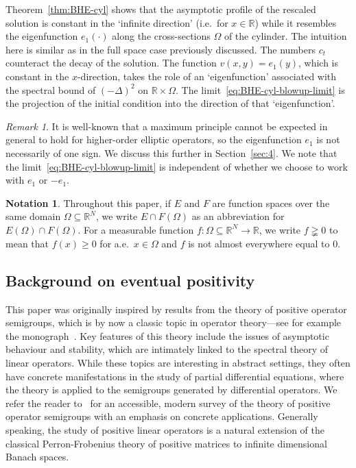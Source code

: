 \documentclass[a4paper, reqno,titlepage]{amsart}
\numberwithin{equation}{section}
\theoremstyle{plain}
\theoremstyle{definition}
\newtheorem*{notation}{Notation}
\theoremstyle{remark}
\newtheorem{remark}[theorem]{Remark}
\newcommand{\RR}{\mathbb{R}}
\begin{document}
Theorem~\ref{thm:BHE-cyl} shows that the asymptotic profile of the rescaled solution is constant in the `infinite direction' (i.e.\ for $x \in \RR$) while it resembles the eigenfunction $e_1(\cdot)$ along the cross-sections $\Omega$ of the cylinder. The intuition here is similar as in the full space case previously discussed. The numbers $c_t$ counteract the decay of the solution. The function $v(x,y)=e_1(y)$, which is constant in the $x$-direction, takes the role of an `eigenfunction' associated with the spectral bound of $(-\Delta)^2$ on $\RR\times\Omega$. The limit~\eqref{eq:BHE-cyl-blowup-limit} is the projection of the initial condition into the direction of that `eigenfunction'.

\begin{remark}
  It is well-known that a maximum principle cannot be expected in general to hold for higher-order elliptic operators, so the eigenfunction $e_1$ is not necessarily of one sign. We discuss this further in Section~\ref{sec:4}. We note that the limit~\eqref{eq:BHE-cyl-blowup-limit} is independent of whether we choose to work with $e_1$ or $-e_1$.
\end{remark}

\begin{notation}
  Throughout this paper, if $E$ and $F$ are function spaces over the same domain $\Omega \subseteq \RR^N$, we write $E \cap F(\Omega)$ as an abbreviation for $E(\Omega) \cap F(\Omega)$.  For a measurable function $f\colon \Omega \subseteq \RR^N \to \RR$, we write $f \gneqq 0$ to mean that $f(x) \geq 0$ for a.e.\ $x \in \Omega$ and $f$ is not almost everywhere equal to 0.
\end{notation}

\subsection{Background on eventual positivity}
This paper was originally inspired by results from the theory of positive operator semigroups, which is by now a classic topic in operator theory---see for example the monograph~\cite{AGG}. Key features of this theory include the issues of asymptotic behaviour and stability, which are intimately linked to the spectral theory of linear operators. While these topics are interesting in abstract settings, they often have concrete manifestations in the study of partial differential equations, where the theory is applied to the semigroups generated by differential operators. We refer the reader to~\cite{BFR} for an accessible, modern survey of the theory of positive operator semigroups with an emphasis on concrete applications. Generally speaking, the study of positive linear operators is a natural extension of the classical Perron-Frobenius theory of positive matrices to infinite dimensional Banach spaces.
\end{document}
